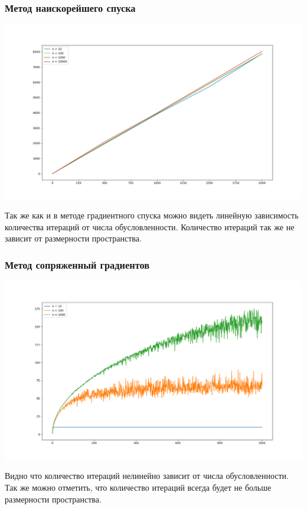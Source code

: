 \documentclass[english]{article}
\begin{document}
\subsubsection{Метод наискорейшего спуска}

\begin{center}
  \includegraphics[scale=0.4]{plots/steepest_gradient_1.png}
\end{center} 
Так же как и в методе градиентного
спуска можно видеть линейную зависимость количества итераций от числа
обусловленности. Количество итераций так же не зависит от размерности
пространства.

\subsubsection{Метод сопряженный градиентов}
\begin{center}
  \includegraphics[scale=0.4]{plots/conjugate_gradient_1.png}
\end{center}
Видно что количество итераций нелинейно зависит от числа
обусловленности. Так же можно отметить, что количество итераций всегда
будет не больше размерности пространства.
\end{document}
